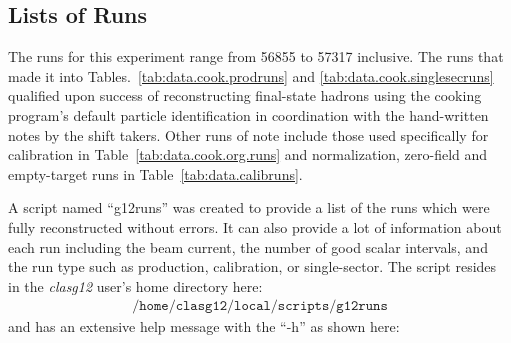 \subsection{\label{sec:summary.runs}Lists of Runs}

The runs for this experiment range from 56855 to 57317 inclusive. The runs that made it into Tables.~\ref{tab:data.cook.prodruns} and \ref{tab:data.cook.singlesecruns} qualified upon success of reconstructing final-state hadrons using the cooking program's default particle identification in coordination with the hand-written notes by the shift takers. Other runs of note include those used specifically for calibration in Table~\ref{tab:data.cook.org.runs} and normalization, zero-field and empty-target runs in Table~\ref{tab:data.calibruns}.





A script named ``g12runs'' was created to provide a list of the runs which were fully reconstructed without errors. It can also provide a lot of information about each run including the beam current, the number of good scalar intervals, and the run type such as production, calibration, or single-sector. The script resides in the \emph{clasg12} user's home directory here:
\begin{align}
    \texttt{/home/clasg12/local/scripts/g12runs} \nonumber
\end{align}
and has an extensive help message with the ``-h'' as shown here:

